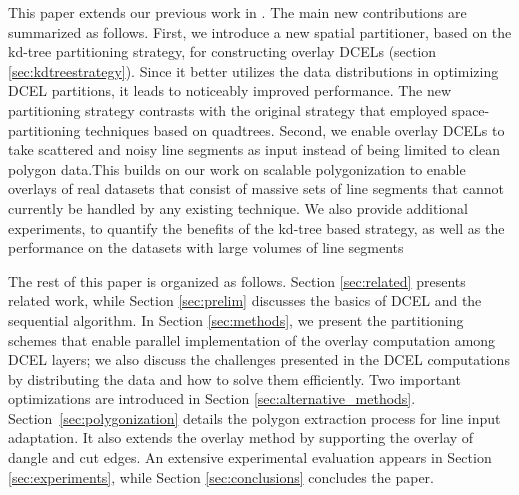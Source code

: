 This paper extends our previous work in \cite{calderon_scalable_2023}. The main new contributions are summarized as follows. First, we introduce a new spatial 
partitioner, based on the kd-tree partitioning strategy, for constructing overlay DCELs (section \ref{sec:kdtreestrategy}). Since it better utilizes the data 
distributions in optimizing DCEL partitions, it leads to noticeably improved performance. The new partitioning strategy contrasts with the original strategy 
that employed space-partitioning techniques based on quadtrees. Second, we enable overlay DCELs to take scattered and noisy line segments as input instead of 
being limited to clean polygon data.This builds on our work on scalable polygonization \cite{abdelhafeez_ddcel_2023} to enable overlays of real datasets that 
consist of 
massive sets of line segments that cannot currently be handled by any existing technique. We also provide additional experiments, to quantify the benefits of 
the kd-tree based strategy, as well as the performance on the datasets with large volumes of line segments

The rest of this paper is organized as follows. Section \ref{sec:related} presents related work, while Section \ref{sec:prelim} discusses the basics of DCEL 
and the sequential algorithm. In Section \ref{sec:methods}, we present the partitioning schemes that enable parallel implementation of the overlay computation 
among DCEL layers; we also discuss the challenges presented in the DCEL computations by distributing the data and how to solve them efficiently. Two important 
optimizations are introduced in Section \ref{sec:alternative_methods}. Section~\ref{sec:polygonization} details the polygon extraction process for line input 
adaptation. It also extends the overlay method by supporting the overlay of dangle and cut edges. An extensive experimental evaluation appears in Section 
\ref{sec:experiments}, while Section \ref{sec:conclusions} concludes the paper.
